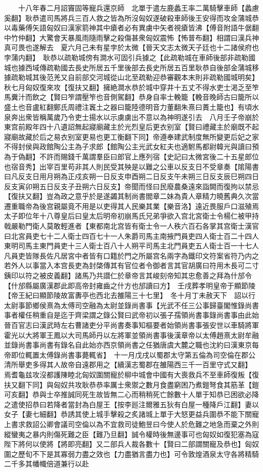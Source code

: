 　　十八年春二月詔竇固等寵兵還京師　北單于遣左鹿蠡王率二萬騎擊車師【蠡慮奚翻】耿恭遣司馬將兵三百人救之皆為所沒匈奴遂破殺車師後王安得而攻金蒲城恭以毒藥傅矢語匈奴曰漢家箭神其中瘡者必有異虜中矢者視瘡皆沸【傅音附語牛倨翻中竹仲翻】大驚會天暴風雨隨雨擊之殺傷甚衆匈奴震怖【怖普布翻】相謂曰漢兵神真可畏也遂解去　夏六月己未有星孛於太微【晉天文志太微天子廷也十二諸侯府也孛蒲内翻】　耿恭以疏勒城傍有澗水可固引兵據之【此疏勒城在車師後部非疏勒國城也據西域傳疏勒國去長史所居五千里後部去長史所居五百里耿恭自後部金蒲城移據疏勒城其後范羌又自前部交河城從山北至疏勒迎恭審觀本末則非疏勒國城明矣】秋七月匈奴復來攻【復扶又翻】擁絶澗水恭於城中穿井十五丈不得水吏士渇乏至笮馬糞汁而飲之【賢曰笮謂壓笮也音側駕翻】恭身自率士輓籠【輓音晚師古曰籠所以盛土也音盧紅翻鄭氏周禮注竁土之器曰籠陸德明音力董翻朱熹曰蕢土籠也】有頃水泉奔出衆皆稱萬歲乃令吏士揚水以示虜虜出不意以為神明遂引去　八月壬子帝崩於東宫前殿年四十八遺詔無起寢廟藏主於光烈皇后更衣别室【賢曰禮藏主於廟既不起寢廟故藏於后之易衣别室更易也更工衡翻下同】帝遵奉建武制度無所變更后妃之家不得封侯與政館陶公主為子求郎【館陶公主光武女紅夫也適駙馬都尉韓光與讀曰預為于偽翻】不許而賜錢千萬謂羣臣曰郎官上應列宿【史記曰太微宮後二十五星郎位也宿音秀】出宰百里苟非其人則民受其殃是以難之公車以反支日不受章奏【隂陽書曰凡反支日用月朔為正戍亥朔一日反支申酉朔二日反支午未朔三日反支辰巳朔四日反支寅卯朔五日反支子丑朔六日反支】帝聞而怪曰民廢農桑遠來詣闕而復拘以禁忌【復扶又翻】豈為政之意乎於是遂蠲其制尚書閻章二妹為貴人章精力曉舊典久次當遷重職帝為後宫親屬竟不用是以吏得其人民樂其業【樂音洛】遠近畏服戶口滋殖焉　太子即位年十八尊皇后曰皇太后明帝初崩馬氏兄弟爭欲入宫北宮衛士令楊仁被甲持戟嚴勒門衛人莫敢輕進者【東都南北宫皆有衛士令一人秩六百石各掌其宫衛士漢官曰北宮員吏七十二人衛士四百七十一人朱爵司馬主南掖門員吏四人衛士百二十四人東明司馬主東門員吏十三人衛士百八十人朔平司馬主北門員吏五人衛士百一十七人凡員吏皆隊長佐凡居宮中者皆有口籍於門之所屬宫名兩字為鐵印文符案省符乃内之若外人以事當入本宫長吏為封棨傳其有官位者令御者言其官胡廣曰符用木長可二寸銕印以符之被皮義翻】諸馬乃共譛仁於章帝言其峻刻帝知其忠愈善之拜為什邡令【什邡縣屬廣漢郡此即高帝封雍齒之什方也邡讀曰方】　壬戌葬孝明皇帝于顯節陵【帝王紀曰顯節陵故富夀亭也西北去雒陽三十七里】　冬十月丁未赦天下　詔以行太尉事節鄉侯熹為太傅司空融為太尉並錄尚書事【光武不任三公事歸臺閣惟錄尚書事者權任稍重自是迄于齊梁謂之錄公賢曰武帝初以張子孺領尚書事錄尚書事由此始晉百官志曰漢武時左右曹諸吏分平尚書奏事知樞要者始領尚書事張安世以車騎將軍霍光以大將軍王鳳以大司馬師丹以左將軍並領尚書事後漢章帝以太傅趙熹太尉牟融並錄尚書事尚書有錄名自此始亦西京領尚書之任猶唐虞大麓之職也沈約曰漢東京每帝即位輒置太傅錄尚書事薨輒省】　十一月戊戌以蜀郡太守第五倫為司空倫在郡公清所舉吏多得其人故帝自遠郡用之【續漢志蜀郡在雒陽西三千一百里守式又翻】　焉耆龜兹攻沒都護陳睦北匈奴圍關寵於柳中城會中國有大喪救兵不至車師復叛【復扶又翻下同】與匈奴共攻耿恭恭率厲士衆禦之數月食盡窮困乃煮鎧弩食其筋革【鎧可亥翻】恭與士卒推誠同死生故皆無二心而稍稍死亡餘數十人單于知恭已困欲必降之遣使招恭曰若降者當封為白屋王【按李廵注爾雅五狄有白屋一種降戶江翻】妻以女子【妻七細翻】恭誘其使上城手擊殺之炙諸城上單于大怒更益兵圍恭不能下關寵上書求救詔公卿會議司空倫以為不宜救司徒鮑昱曰今使人於危難之地急而棄之外則縱蠻夷之暴内則傷死難之臣【難乃旦翻】誠令權時後無邊事可也匈奴如復犯塞為寇陛下將何以使將【將即亮翻】又二部兵人裁各數十【賢曰二部謂關寵及恭也】匈奴圍之歷旬不下是其寡弱力盡之效也【力盡猶言盡力也】可令敦煌酒泉太守各將精騎二千多其幡幟倍道兼行以赴
